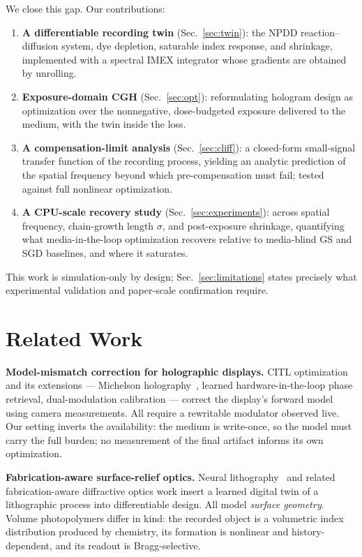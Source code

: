 \documentclass[conference]{IEEEtran}
\begin{document}
We close this gap. Our contributions:
\begin{enumerate}
\item \textbf{A differentiable recording twin} (Sec.~\ref{sec:twin}): the NPDD
reaction--diffusion system, dye depletion, saturable index response, and
shrinkage, implemented with a spectral IMEX integrator whose gradients are
obtained by unrolling.
\item \textbf{Exposure-domain CGH} (Sec.~\ref{sec:opt}): reformulating
hologram design as optimization over the nonnegative, dose-budgeted exposure
delivered to the medium, with the twin inside the loss.
\item \textbf{A compensation-limit analysis} (Sec.~\ref{sec:cliff}): a
closed-form small-signal transfer function of the recording process, yielding
an analytic prediction of the spatial frequency beyond which pre-compensation
must fail; tested against full nonlinear optimization.
\item \textbf{A CPU-scale recovery study} (Sec.~\ref{sec:experiments}):
across spatial frequency, chain-growth length $\sigma$, and post-exposure
shrinkage, quantifying what media-in-the-loop optimization recovers relative
to media-blind GS and SGD baselines, and where it saturates.
\end{enumerate}
This work is simulation-only by design; Sec.~\ref{sec:limitations} states
precisely what experimental validation and paper-scale confirmation require.

\section{Related Work}
\textbf{Model-mismatch correction for holographic displays.} CITL
optimization~\cite{peng2020neural} and its extensions — Michelson
holography~\cite{choi2022time}, learned hardware-in-the-loop phase retrieval,
dual-modulation calibration — correct the display's forward model using
camera measurements. All require a rewritable modulator observed live. Our
setting inverts the availability: the medium is write-once, so the model must
carry the full burden; no measurement of the final artifact informs its own
optimization.

\textbf{Fabrication-aware surface-relief optics.} Neural
lithography~\cite{zheng2023neural} and related fabrication-aware diffractive
optics work insert a learned digital twin of a lithographic process into
differentiable design. All model \emph{surface geometry}. Volume
photopolymers differ in kind: the recorded object is a volumetric index
distribution produced by chemistry, its formation is nonlinear and
history-dependent, and its readout is Bragg-selective.
\end{document}
